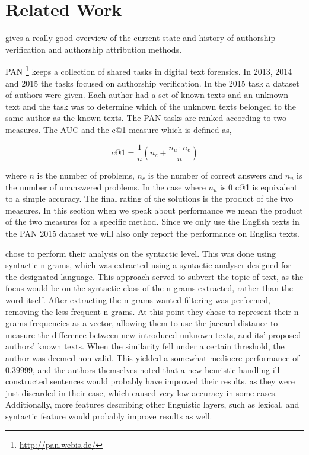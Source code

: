 \section{Related Work}
\cite{stamatos2009} gives a really good overview of the current state and
history of authorship verification and authorship attribution methods.

PAN \footnote{\url{http://pan.webis.de/}} keeps a collection of shared tasks in
digital text forensics. In 2013, 2014 and 2015 the tasks focused on authorship
verification. In the 2015 task a dataset of authors were given. Each author had
a set of known texts and an unknown text and the task was to determine which
of the unknown texts belonged to the same author as the known texts. The PAN
tasks are ranked according to two measures. The \gls{AUC} and the c@1 measure
\cite{penas2011} which is defined as,

\begin{equation}
    c@1 = \frac{1}{n} \left(n_c + \frac{n_u \cdot n_c}{n}\right)
\end{equation}

where $n$ is the number of problems, $n_c$ is the number of correct answers and
$n_u$ is the number of unanswered problems. In the case where $n_u$ is 0 c@1
is equivalent to a simple accuracy. The final rating of the solutions is the
product of the two measures. In this section when we speak about performance we
mean the product of the two measures for a specific method. Since we only use
the English texts in the PAN 2015 dataset we will also only report the
performance on English texts.

\cite{juanpablo2015} chose to perform their analysis on the syntactic level.
This was done using syntactic n-grams, which was extracted using a syntactic
analyser designed for the designated language. This approach served to subvert
the topic of text, as the focus would be on the syntactic class of the n-grams
extracted, rather than the word itself. After extracting the n-grams wanted
filtering was performed, removing the less frequent n-grams. At this point
they chose to represent their n-grams frequencies as a vector, allowing them
to use the jaccard distance to measure the difference between new introduced
unknown texts, and its' proposed authors' known texts. When the similarity fell
under a certain threshold, the author was deemed non-valid. This yielded a
somewhat mediocre performance of 0.39999, and the authors themselves noted that
a new heuristic handling ill-constructed sentences would probably have improved
their results, as they were just discarded in their case, which caused very low
accuracy in some cases. Additionally, more features describing other linguistic
layers, such as lexical, and syntactic feature would probably improve results as
well.

